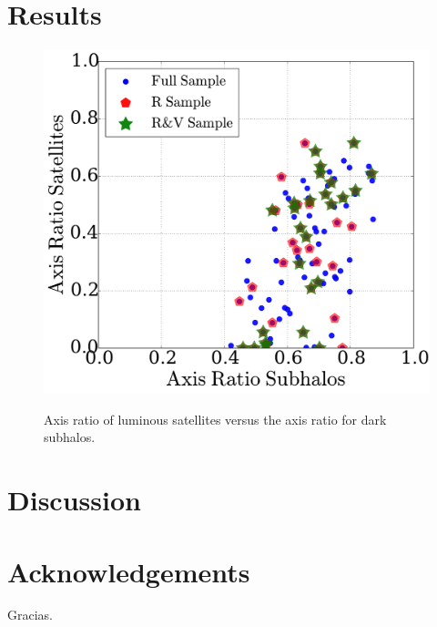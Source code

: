 \documentclass{emulateapj}
\begin{document}
\section{Results}
\label{Results}
\begin{figure}
\centering
\includegraphics[width=\hsize]{axratio_dark_bright.pdf}\\
\caption{Axis ratio of luminous satellites versus the axis ratio for
  dark subhalos.}
\label{fig:StreamPlaneOrbit}
\end{figure}


\section{Discussion} 
\section{Acknowledgements}
Gracias.


\end{document}

